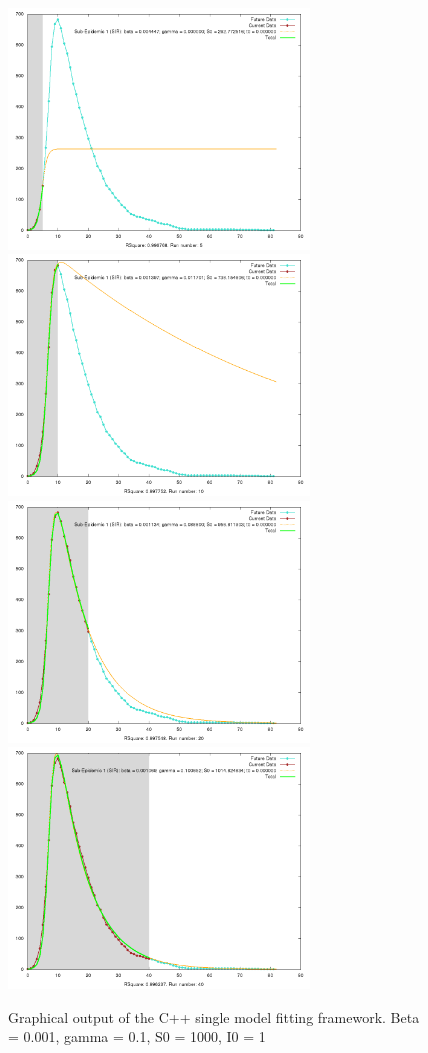 \begin{figure}
  \centering
  \includegraphics[width=8cm]{images/output5}
  \includegraphics[width=8cm]{images/output10}
  \includegraphics[width=8cm]{images/output20}
  \includegraphics[width=8cm]{images/output40}
\caption{Graphical output of the C++ single model fitting
  framework. Beta = 0.001, gamma = 0.1, S0 = 1000, I0 = 1}
\label{fig:sirc}
\end{figure}

